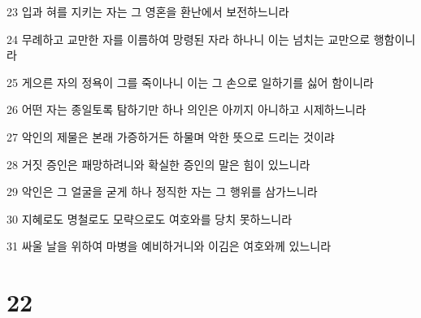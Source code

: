 \par 23 입과 혀를 지키는 자는 그 영혼을 환난에서 보전하느니라
\par 24 무례하고 교만한 자를 이름하여 망령된 자라 하나니 이는 넘치는 교만으로 행함이니라
\par 25 게으른 자의 정욕이 그를 죽이나니 이는 그 손으로 일하기를 싫어 함이니라
\par 26 어떤 자는 종일토록 탐하기만 하나 의인은 아끼지 아니하고 시제하느니라
\par 27 악인의 제물은 본래 가증하거든 하물며 악한 뜻으로 드리는 것이랴
\par 28 거짓 증인은 패망하려니와 확실한 증인의 말은 힘이 있느니라
\par 29 악인은 그 얼굴을 굳게 하나 정직한 자는 그 행위를 삼가느니라
\par 30 지혜로도 명철로도 모략으로도 여호와를 당치 못하느니라
\par 31 싸울 날을 위하여 마병을 예비하거니와 이김은 여호와께 있느니라

\chapter{22}

